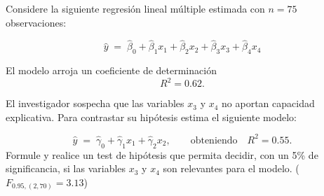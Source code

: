 \documentclass[10pt,a4paper]{article}
\begin{document}

\item Considere la siguiente regresión lineal múltiple estimada con \(n = 75\) observaciones:

\[
\hat{y} \;=\; \hat{\beta}_{0} + \hat{\beta}_{1}x_{1} + \hat{\beta}_{2}x_{2} +\hat{\beta}_{3}x_{3} +\hat{\beta}_{4}x_{4} 
\]

El modelo arroja un coeficiente de determinación
\[
R^2 = 0.62.
\]

El investigador sospecha que las variables \(x_{3}\) y \(x_{4}\) no aportan capacidad explicativa.  
Para contrastar su hipótesis estima el siguiente modelo:

\[
\hat{y} \;=\;\hat{\gamma}_{0} + \hat{\gamma}_{1}x_{1} + \hat{\gamma}_{2}x_{2} ,
\qquad\text{obteniendo}\quad
R^2 = 0.55.
\]
Formule y realice un test de hipótesis que permita decidir, con un 5\% de significancia, si las variables \(x_{3}\) y \(x_{4}\) son relevantes para el modelo. ($F_{0.95,(2,70)}=3.13$)
\end{document}
